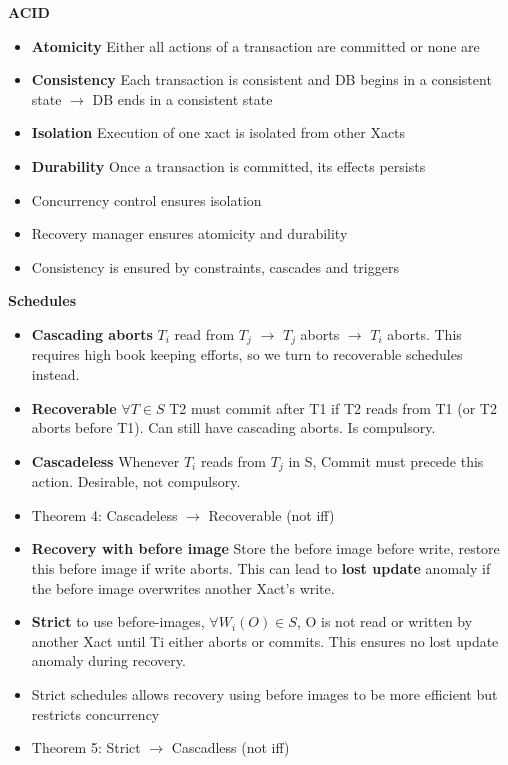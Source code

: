 \documentclass[10pt, landscape]{article}
\begin{document}
\begin{multicols}{4}
\textbf{ACID}
\begin{itemize}
  \item \textbf{Atomicity} Either all actions of a transaction are committed or none are
  \item \textbf{Consistency} Each transaction is consistent and DB begins in a consistent state $\rightarrow$ DB ends in a consistent state
  \item \textbf{Isolation} Execution of one xact is isolated from other Xacts 
  \item \textbf{Durability} Once a transaction is committed, its effects persists
  \item Concurrency control ensures isolation 
  \item Recovery manager ensures atomicity and durability
  \item Consistency is ensured by constraints, cascades and triggers
\end{itemize}


\textbf{Schedules} \\
\begin{itemize} 
  \item \textbf{Cascading aborts} $T_i$ read from $T_j$ $\rightarrow$ $T_j$ aborts $\rightarrow$ $T_i$ aborts. This requires high book keeping efforts, so we turn to recoverable schedules instead.
  \item \textbf{Recoverable} $\forall T \in S$ T2 must commit after T1 if T2 reads from T1 (or T2 aborts before T1). Can still have cascading aborts. Is compulsory. 
  \item \textbf{Cascadeless} Whenever $T_i$ reads from $T_j$ in S, Commit must precede this action. Desirable, not compulsory.
  \item Theorem 4: Cascadeless $\rightarrow$ Recoverable (not iff)
  \item \textbf{Recovery with before image} Store the before image before write, restore this before image if write aborts. This can lead to \textbf{lost update} anomaly if the before image overwrites another Xact's write.
  \item \textbf{Strict}  to use before-images, $\forall W_i(O) \in S$, O is not read or written by another Xact until Ti either aborts or commits. This ensures no lost update anomaly during recovery.
  \item Strict schedules allows recovery using before images to be more efficient but restricts concurrency
  \item Theorem 5: Strict $\rightarrow$ Cascadless (not iff)
\end{itemize}


\end{multicols}
\end{document}
